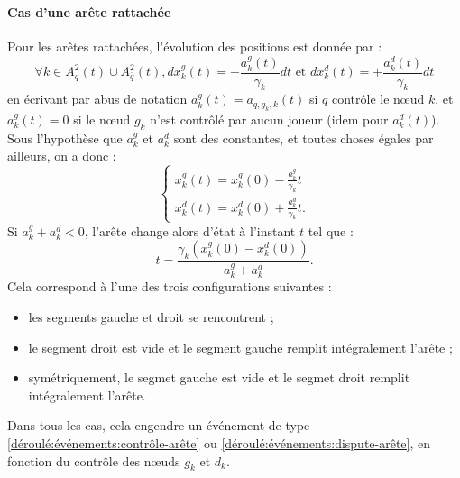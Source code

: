 \documentclass[a4paper,11pt,headings=normal]{scrartcl}
\theoremstyle{mythm}
\begin{document}
\paragraph{Cas d'une arête rattachée} Pour les arêtes rattachées,
l'évolution des positions est donnée par :
\begin{equation}
  \forall k \in A^2_q(t) \cup A^2_{\bar q}(t), dx^g_k(t) = -\frac{a^g_k(t)}{\gamma_k} dt \text{~et~} dx^d_k(t) = +\frac{a^d_k(t)}{\gamma_k} dt
\end{equation}
en écrivant par abus de notation $a^g_k(t) = a_{q,g_k,k}(t)$ si $q$
contrôle le nœud $k$, et $a^g_k(t) = 0$ si le nœud $g_k$ n'est
contrôlé par aucun joueur (idem pour $a^d_k(t)$). Sous l'hypothèse que
$a^g_k$ et $a^d_k$ sont des constantes, et toutes choses égales par
ailleurs, on a donc :
\begin{equation}
\begin{cases}
  x^g_k(t) = x^g_k(0)  -\frac{a^g_k}{\gamma_k} t \\
  x^d_k(t) = x^d_k(0) + \frac{a^d_k}{\gamma_k} t.
\end{cases}
\end{equation}
Si $a^g_k + a^d_k < 0$, l'arête change alors d'état à l'instant $t$
tel que :
\begin{equation}
  t = \frac{\gamma_k \left( x^g_k(0) - x^d_k(0) \right)}{a^g_k + a^d_k}.
\end{equation}
Cela correspond à l'une des trois configurations suivantes :
\begin{itemize}
  \item les segments gauche et droit se rencontrent ;

  \item le segment droit est vide et le segment gauche remplit
    intégralement l'arête ;

  \item symétriquement, le segmet gauche est vide et le segmet droit
    remplit intégralement l'arête.
\end{itemize}
Dans tous les cas, cela engendre un événement de type
\ref{déroulé:événements:contrôle-arête} ou
\ref{déroulé:événements:dispute-arête}, en fonction du contrôle des
nœuds $g_k$ et $d_k$.
\end{document}
